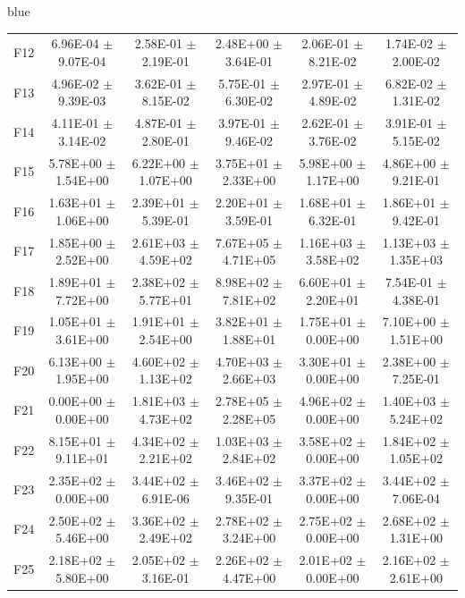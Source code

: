 \documentclass[journal, onecolumn]{IEEEtran}
\begin{document}
\begin{color}{blue}
\begin{table}[htbp!]
\begin{tabular}{c|ccccc}
		F12	 &	6.96E-04	$\pm$	9.07E-04	 &	2.58E-01	$\pm$	2.19E-01		 &	2.48E+00	$\pm$	3.64E-01		 &	2.06E-01	$\pm$	8.21E-02		 &	1.74E-02	$\pm$	2.00E-02	\\		
		F13	 &	4.96E-02	$\pm$	9.39E-03	 &	3.62E-01	$\pm$	8.15E-02		 &	5.75E-01	$\pm$	6.30E-02		 &	2.97E-01	$\pm$	4.89E-02		 &	6.82E-02	$\pm$	1.31E-02	\\		
		F14	 &	4.11E-01	$\pm$	3.14E-02	 &	4.87E-01	$\pm$	2.80E-01		 &	3.97E-01	$\pm$	9.46E-02		 &	2.62E-01	$\pm$	3.76E-02		 &	3.91E-01	$\pm$	5.15E-02	\\		
		F15	 &	5.78E+00	$\pm$	1.54E+00	 &	6.22E+00	$\pm$	1.07E+00		 &	3.75E+01	$\pm$	2.33E+00		 &	5.98E+00	$\pm$	1.17E+00		 &	4.86E+00	$\pm$	9.21E-01	\\		
		F16	 &	1.63E+01	$\pm$	1.06E+00	 &	2.39E+01	$\pm$	5.39E-01		 &	2.20E+01	$\pm$	3.59E-01		 &	1.68E+01	$\pm$	6.32E-01		 &	1.86E+01	$\pm$	9.42E-01	\\		
		F17	 &	1.85E+00	$\pm$	2.52E+00	 &	2.61E+03	$\pm$	4.59E+02		 &	7.67E+05	$\pm$	4.71E+05		 &	1.16E+03	$\pm$	3.58E+02		 &	1.13E+03	$\pm$	1.35E+03	\\		
		F18	 &	1.89E+01	$\pm$	7.72E+00	 &	2.38E+02	$\pm$	5.77E+01		 &	8.98E+02	$\pm$	7.81E+02		 &	6.60E+01	$\pm$	2.20E+01		 &	7.54E-01	$\pm$	4.38E-01	\\		
		F19	 &	1.05E+01	$\pm$	3.61E+00	 &	1.91E+01	$\pm$	2.54E+00		 &	3.82E+01	$\pm$	1.88E+01		 &	1.75E+01	$\pm$	0.00E+00		 &	7.10E+00	$\pm$	1.51E+00	\\		
		F20	 &	6.13E+00	$\pm$	1.95E+00	 &	4.60E+02	$\pm$	1.13E+02		 &	4.70E+03	$\pm$	2.66E+03		 &	3.30E+01	$\pm$	0.00E+00		 &	2.38E+00	$\pm$	7.25E-01	\\		
		F21	 &	0.00E+00	$\pm$	0.00E+00	 &	1.81E+03	$\pm$	4.73E+02		 &	2.78E+05	$\pm$	2.28E+05		 &	4.96E+02	$\pm$	0.00E+00		 &	1.40E+03	$\pm$	5.24E+02	\\		
		F22	 &	8.15E+01	$\pm$	9.11E+01	 &	4.34E+02	$\pm$	2.21E+02		 &	1.03E+03	$\pm$	2.84E+02		 &	3.58E+02	$\pm$	0.00E+00		 &	1.84E+02	$\pm$	1.05E+02	\\		
		F23	 &	2.35E+02	$\pm$	0.00E+00	 &	3.44E+02	$\pm$	6.91E-06		 &	3.46E+02	$\pm$	9.35E-01		 &	3.37E+02	$\pm$	0.00E+00		 &	3.44E+02	$\pm$	7.06E-04	\\		
		F24	 &	2.50E+02	$\pm$	5.46E+00	 &	3.36E+02	$\pm$	2.49E+02		 &	2.78E+02	$\pm$	3.24E+00		 &	2.75E+02	$\pm$	0.00E+00		 &	2.68E+02	$\pm$	1.31E+00	\\		
		F25	 &	2.18E+02	$\pm$	5.80E+00	 &	2.05E+02	$\pm$	3.16E-01		 &	2.26E+02	$\pm$	4.47E+00		 &	2.01E+02	$\pm$	0.00E+00		 &	2.16E+02	$\pm$	2.61E+00	\\		

\end{tabular}
\end{table}
\end{color}
\end{document}
